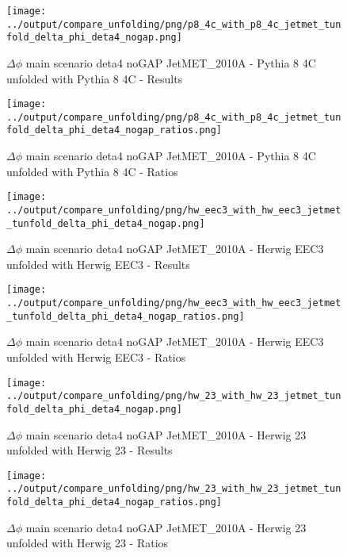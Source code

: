 \documentclass[11pt]{book}
\begin{document}
\begin{figure}[ht]
\centering
\texttt{[image: ../output/compare\_unfolding/png/p8\_4c\_with\_p8\_4c\_jetmet\_tunfold\_delta\_phi\_deta4\_nogap.png]}
\caption{$\Delta\phi$ main scenario deta4 noGAP JetMET\_2010A - Pythia 8 4C unfolded with Pythia 8 4C - Results}
\label{p8_p8_jetmet_tunfold_delta_phi_deta4_nogap_a}
\end{figure}

\begin{figure}[ht]
\centering
\texttt{[image: ../output/compare\_unfolding/png/p8\_4c\_with\_p8\_4c\_jetmet\_tunfold\_delta\_phi\_deta4\_nogap\_ratios.png]}
\caption{$\Delta\phi$ main scenario deta4 noGAP JetMET\_2010A - Pythia 8 4C unfolded with Pythia 8 4C - Ratios}
\label{p8_p8_jetmet_tunfold_delta_phi_deta4_nogap_b}
\end{figure}

\begin{figure}[ht]
\centering
\texttt{[image: ../output/compare\_unfolding/png/hw\_eec3\_with\_hw\_eec3\_jetmet\_tunfold\_delta\_phi\_deta4\_nogap.png]}
\caption{$\Delta\phi$ main scenario deta4 noGAP JetMET\_2010A - Herwig EEC3 unfolded with Herwig EEC3 - Results}
\label{hw_eec3_hw_eec3_jetmet_tunfold_delta_phi_deta4_nogap_a}
\end{figure}

\begin{figure}[ht]
\centering
\texttt{[image: ../output/compare\_unfolding/png/hw\_eec3\_with\_hw\_eec3\_jetmet\_tunfold\_delta\_phi\_deta4\_nogap\_ratios.png]}
\caption{$\Delta\phi$ main scenario deta4 noGAP JetMET\_2010A - Herwig EEC3 unfolded with Herwig EEC3 - Ratios}
\label{hw_eec3_hw_eec3_jetmet_tunfold_delta_phi_deta4_nogap_b}
\end{figure}

\begin{figure}[ht]
\centering
\texttt{[image: ../output/compare\_unfolding/png/hw\_23\_with\_hw\_23\_jetmet\_tunfold\_delta\_phi\_deta4\_nogap.png]}
\caption{$\Delta\phi$ main scenario deta4 noGAP JetMET\_2010A - Herwig 23 unfolded with Herwig 23 - Results}
\label{hw_23_hw_23_jetmet_tunfold_delta_phi_deta4_nogap_a}
\end{figure}

\begin{figure}[ht]
\centering
\texttt{[image: ../output/compare\_unfolding/png/hw\_23\_with\_hw\_23\_jetmet\_tunfold\_delta\_phi\_deta4\_nogap\_ratios.png]}
\caption{$\Delta\phi$ main scenario deta4 noGAP JetMET\_2010A - Herwig 23 unfolded with Herwig 23 - Ratios}
\label{hw_23_hw_23_jetmet_tunfold_delta_phi_deta4_nogap_b}
\end{figure}
\end{document}
